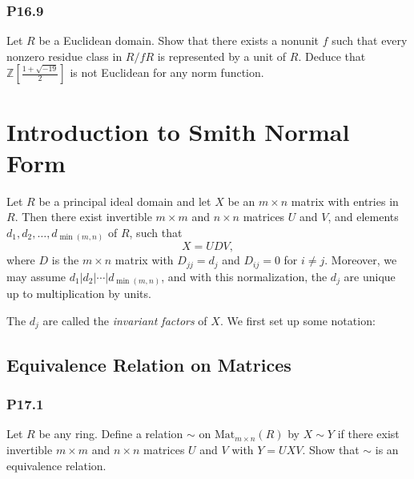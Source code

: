 \documentclass[lang=cn,11pt]{template}
\begin{document}
\subsection*{P16.9} Let \( R \) be a Euclidean domain. Show that there exists a nonunit \( f \) such that every nonzero residue class in \( R/fR \) is represented by a unit of \( R \). Deduce that \( \mathbb{Z}\left[\frac{1 + \sqrt{-19}}{2}\right] \) is not Euclidean for any norm function.








\chapter{Introduction to Smith Normal Form}

\begin{theorem}
Let \( R \) be a principal ideal domain and let \( X \) be an \( m \times n \) matrix with entries in \( R \).
Then there exist invertible \( m \times m \) and \( n \times n \) matrices \( U \) and \( V \), and elements \( d_1, d_2, \ldots, d_{\min(m,n)} \) of \( R \), such that
\[
X = U D V,
\]
where \( D \) is the \( m \times n \) matrix with \( D_{jj} = d_j \) and \( D_{ij} = 0 \) for \( i \neq j \). Moreover, we may assume \( d_1 | d_2 | \cdots | d_{\min(m,n)} \), and with this normalization, the \( d_j \) are unique up to multiplication by units.
\end{theorem}

The \( d_j \) are called the \textit{invariant factors} of \( X \). We first set up some notation:

\section{Equivalence Relation on Matrices}

\subsection*{P17.1}
Let \( R \) be any ring. Define a relation \( \sim \) on \( \text{Mat}_{m \times n}(R) \) by \( X \sim Y \) if there exist invertible \( m \times m \) and \( n \times n \) matrices \( U \) and \( V \) with \( Y = U X V \). Show that \( \sim \) is an equivalence relation.
\end{document}
